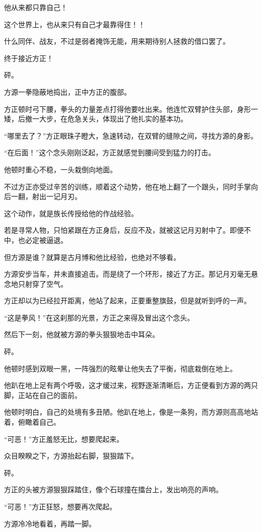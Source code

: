 \begin{this_body}
他从来都只靠自己！

这个世界上，也从来只有自己才最靠得住！！

什么同伴、战友，不过是弱者掩饰无能，用来期待别人拯救的借口罢了。

终于接近方正！

砰。

方源一拳隐蔽地捣出，正中方正的腹部。

方正顿时弓下腰，拳头的力量差点打得他要吐出来。他连忙双臂护住头部，身形一矮，后撤一大步，在危急关头，体现出了他扎实的基本功。

“哪里去了？”方正眼珠子瞪大，急速转动，在双臂的缝隙之间，寻找方源的身影。

“在后面！”这个念头刚刚泛起，方正就感觉到腰间受到猛力的打击。

他顿时重心不稳，一头栽倒向地面。

不过方正亦受过辛苦的训练，顺着这个动势，他在地上翻了一个跟头，同时手掌向后一翻，射出一记月刃。

这个动作，就是族长传授给他的作战经验。

若是寻常人物，只怕紧跟在方正身后，反应不及，就被这记月刃射中了。即便不中，也必定被逼退。

但方源是谁？就算是古月博和他比经验，也绝对不够看。

方源安步当车，并未直接追击。而是绕了一个环形，接近了方正。那记月刃毫无悬念地只射穿了空气。

方正却以为已经拉开距离，他站了起来，正要重整旗鼓，但是就听到呼的一声。

“这是拳风！”在这刹那的光景，方正之来得及冒出这个念头。

然后下一刻，他就被方源的拳头狠狠地击中耳朵。

砰。

他顿时感到双眼一黑，一阵强烈的眩晕让他失去了平衡，彻底栽倒在地上。

他趴在地上足有两个呼吸，这才缓过来，视野逐渐清晰后，方正便看到方源的两只脚，正站在自己的面前。

他顿时明白，自己的处境有多丑陋。他趴在地上，像是一条狗，而方源则高高地站着，俯瞰着自己。

“可恶！”方正羞怒无比，想要爬起来。

众目睽睽之下，方源抬起右脚，狠狠踏下。

砰。

方正的头被方源狠狠踩踏住，像个石球撞在擂台上，发出响亮的声响。

“可恶！”方正狂怒，想要再次爬起。

方源冷冷地看着，再踏一脚。


\end{this_body}
